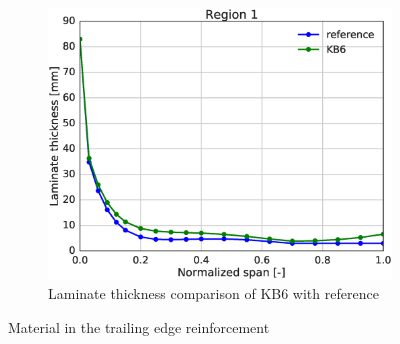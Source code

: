 \begin{figure}[tph]
\begin{subfigure}{\textwidth}
\centering
\includegraphics[width=0.50\linewidth]{figures/KB6_final/KB6_r01_thickness.eps}
\caption{Laminate thickness comparison of KB6 with reference}
\label{subfig:KB6_thick_r01}
\end{subfigure}
\caption{ Material in the trailing edge reinforcement}
\label{fig:KB6_mat_r01}
\end{figure}

